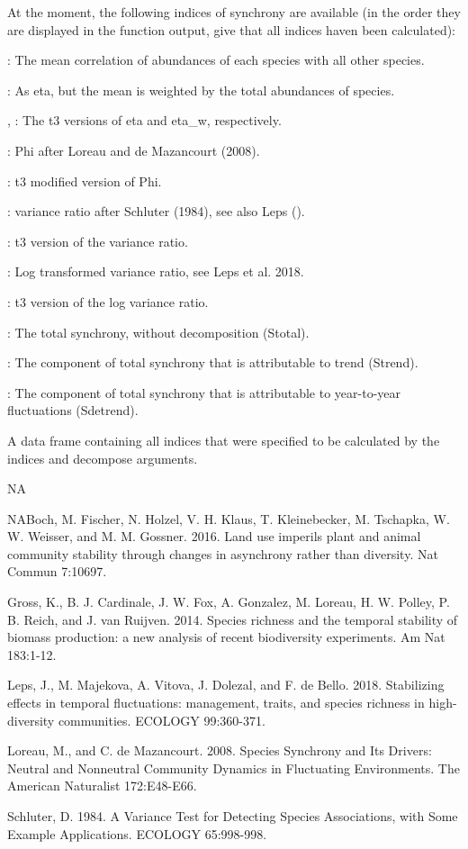 \begin{Details}\relax
At the moment, the following indices of synchrony are available (in the order they are displayed in the function output, give that all indices haven been calculated):

: The mean correlation of abundances of each species with all other species.

: As eta, but the mean is weighted by the total abundances of species.

, : The t3 versions of eta and eta\_w, respectively.

: Phi after Loreau and de Mazancourt (2008).

: t3 modified version of Phi.

: variance ratio after Schluter (1984), see also Leps ().

: t3 version of the variance ratio.

: Log transformed variance ratio, see Leps et al. 2018.

: t3 version of the log variance ratio.

: The total synchrony, without decomposition (Stotal).

: The component of total synchrony that is attributable to trend (Strend).

: The component of total synchrony that is attributable to year-to-year fluctuations (Sdetrend).
\end{Details}
%
\begin{Value}
A data frame containing all indices that were specified to be
calculated by the indices and decompose arguments.
\end{Value}
%
\begin{Author}\relax
NA\end{Author}
%
\begin{References}\relax
NABoch, M. Fischer, N. Holzel, V. H. Klaus, T. Kleinebecker, M. Tschapka, W.
W. Weisser, and M. M. Gossner. 2016. Land use imperils plant and animal
community stability through changes in asynchrony rather than diversity.
Nat Commun 7:10697.

Gross, K., B. J. Cardinale, J. W. Fox, A. Gonzalez, M. Loreau, H.
W. Polley, P. B. Reich, and J. van Ruijven. 2014. Species richness and the
temporal stability of biomass production: a new analysis of recent
biodiversity experiments. Am Nat 183:1-12.

Leps, J., M. Majekova, A. Vitova, J. Dolezal, and F. de Bello.
2018. Stabilizing effects in temporal fluctuations: management, traits, and
species richness in high-diversity communities. ECOLOGY 99:360-371.

Loreau, M., and C. de Mazancourt. 2008. Species Synchrony and Its
Drivers: Neutral and Nonneutral Community Dynamics in Fluctuating
Environments. The American Naturalist 172:E48-E66.

Schluter, D. 1984. A Variance Test for Detecting Species
Associations, with Some Example Applications. ECOLOGY 65:998-998.
\end{References}

